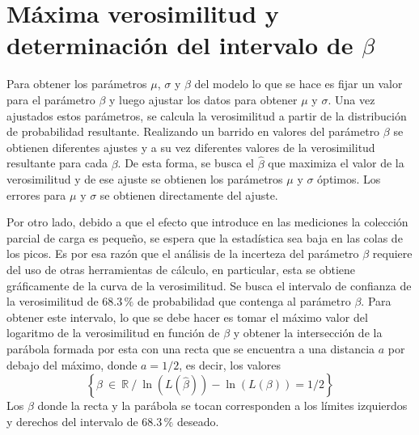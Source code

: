 \section{Máxima verosimilitud y determinación del intervalo de \texorpdfstring{$\beta$}{beta}\label{sec:MaximaVerosimilitud}}
\noindent Para obtener los parámetros $\mu$, $\sigma$ y $\beta$ del modelo lo que se hace es fijar un valor para el parámetro $\beta$ y luego ajustar los datos para obtener $\mu$ y $\sigma$. Una vez ajustados estos parámetros, se calcula la verosimilitud a partir de la distribución de probabilidad resultante. Realizando un barrido en valores del parámetro $\beta$ se obtienen diferentes ajustes y a su vez diferentes valores de la verosimilitud resultante para cada $\beta$. De esta forma, se busca el $\hat{\beta}$ que maximiza el valor de la verosimilitud y de ese ajuste se obtienen los parámetros $\mu$ y $\sigma$ óptimos. Los errores para $\mu$ y $\sigma$ se obtienen directamente del ajuste. 

Por otro lado, debido a que el efecto que introduce en las mediciones la colección parcial de carga es pequeño, se espera que la estadística sea baja en las colas de los picos. Es por esa razón que el análisis de la incerteza del parámetro $\beta$ requiere del uso de otras herramientas de cálculo, en particular, esta se obtiene gráficamente de la curva de la verosimilitud. Se busca el intervalo de confianza de la verosimilitud de $68.3\,\%$ de probabilidad que contenga al parámetro $\beta$. Para obtener este intervalo, lo que se debe hacer es tomar el máximo valor del logaritmo de la verosimilitud en función de $\beta$ y obtener la intersección de la parábola formada por esta con una recta que se encuentra a una distancia $a$ por debajo del máximo, donde $a = 1/2$, es decir, los valores 
\begin{equation*}
    \left\{
        \beta\ \in\ \mathbb{R}\ /\ 
        \ln{(L(\hat{\beta}))}
        -
        \ln{
            \left(
                L(\beta)
            \right)
            }
        = 1/2
    \right\}
\end{equation*}
Los $\beta$ donde la recta y la parábola se tocan corresponden a los límites izquierdos y derechos del intervalo de $68.3\,\%$ deseado\cite{Frodesen}.

